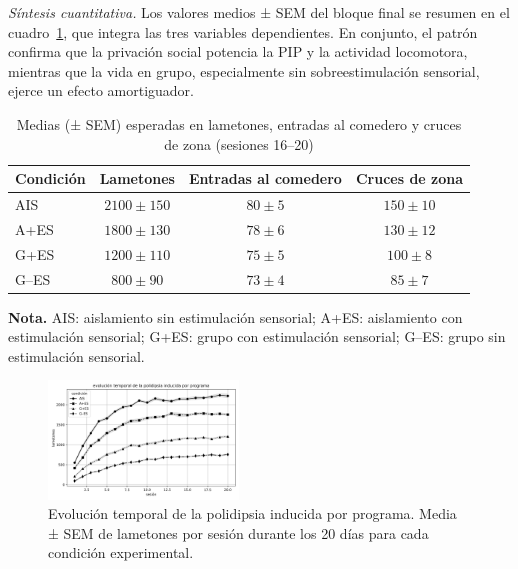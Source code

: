\documentclass[12pt,a4paper]{article}
\begin{document}
\begin{multicols}{2}
\textit{Síntesis cuantitativa.} Los valores medios ± SEM del bloque final se resumen en el cuadro~\ref{tab:tabla1}, que integra las tres variables dependientes. En conjunto, el patrón confirma que la privación social potencia la PIP y la actividad locomotora, mientras que la vida en grupo, especialmente sin sobreestimulación sensorial, ejerce un efecto amortiguador.

\begin{table}[t]
    \centering
    \caption{Medias (± SEM) esperadas en lametones, entradas al comedero y cruces de zona (sesiones 16--20)}
    \label{tab:tabla1}
    \begin{tabular}{lccc}
    \toprule
    \textbf{Condición} & \textbf{Lametones} & \textbf{Entradas al comedero} & \textbf{Cruces de zona} \\
    \midrule
    AIS   & $2100 \pm 150$ & $80 \pm 5$ & $150 \pm 10$ \\
    A+ES  & $1800 \pm 130$ & $78 \pm 6$ & $130 \pm 12$ \\
    G+ES  & $1200 \pm 110$ & $75 \pm 5$ & $100 \pm 8$ \\
    G--ES & $800 \pm 90$   & $73 \pm 4$ & $85 \pm 7$ \\
    \bottomrule
    \end{tabular}
    
    \vspace{1mm}
    \parbox{\textwidth}{\small \textbf{Nota.} AIS: aislamiento sin estimulación sensorial; A+ES: aislamiento con estimulación sensorial; G+ES: grupo con estimulación sensorial; G--ES: grupo sin estimulación sensorial.}
\end{table}


\begin{figure}[H]
\centering
\includegraphics[width=0.45\textwidth]{figura1.png}
\caption{Evolución temporal de la polidipsia inducida por programa. Media ± SEM de lametones por sesión durante los 20 días para cada condición experimental.}
\label{fig:figura1}
\end{figure}


\end{multicols}
\end{document}
